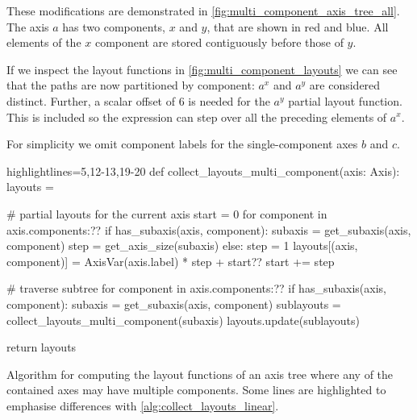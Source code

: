 \documentclass[thesis]{subfiles}
\begin{document}
These modifications are demonstrated in \cref{fig:multi_component_axis_tree_all}.
The axis $a$ has two components, $x$ and $y$, that are shown in red and blue.
All elements of the $x$ component are stored contiguously before those of $y$.

If we inspect the layout functions in \cref{fig:multi_component_layouts} we can see that the paths are now partitioned by component: $a^x$ and $a^y$ are considered distinct.
Further, a scalar offset of 6 is needed for the $a^y$ partial layout function.
This is included so the expression can step over all the preceding elements of $a^x$.

For simplicity we omit component labels for the single-component axes $b$ and $c$.

\begin{algorithm}
  \begin{center}
    \begin{minipage}{.9\textwidth}
      \begin{pyalg2*}{highlightlines={5,12-13,19-20}}
        def collect_layouts_multi_component(axis: Axis):
          layouts = {}

          # partial layouts for the current axis
          start = 0
          for component in axis.components:?\label{code:mc_loop1}?
            if has_subaxis(axis, component):
              subaxis = get_subaxis(axis, component)
              step = get_axis_size(subaxis)
            else:
              step = 1
              layouts[(axis, component)] = AxisVar(axis.label) * step + start?\label{code:mc_layout_store}?
            start += step

          # traverse subtree
          for component in axis.components:?\label{code:mc_loop1}?
            if has_subaxis(axis, component): 
              subaxis = get_subaxis(axis, component)
              sublayouts = collect_layouts_multi_component(subaxis)
              layouts.update(sublayouts)

          return layouts
      \end{pyalg2*}
    \end{minipage}
  \end{center}

  \caption{
    Algorithm for computing the layout functions of an axis tree where any of the contained axes may have multiple components.
    Some lines are highlighted to emphasise differences with \cref{alg:collect_layouts_linear}.
  }
  \label{alg:collect_layouts_multi_component}
\end{algorithm}
\end{document}
